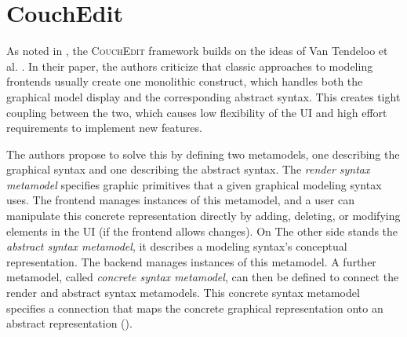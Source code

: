 \section{CouchEdit}
\label{sec:CouchEdit}








As noted in , the \textsc{CouchEdit} framework builds on the ideas of Van Tendeloo et al. \cite{van_tendeloo_concrete_2017}. In their paper, the authors criticize that classic approaches to modeling frontends usually create one monolithic construct, which handles both the graphical model display and the corresponding abstract syntax. This creates tight coupling between the two, which causes low flexibility of the UI and high effort requirements to implement new features. 

The authors propose to solve this by defining two metamodels, one describing the graphical syntax and one describing the abstract syntax. The \emph{render syntax metamodel} specifies graphic primitives that a given graphical modeling syntax uses. The frontend manages instances of this metamodel, and a user can manipulate this concrete representation directly by adding, deleting, or modifying elements in the UI (if the frontend allows changes). On The other side stands the \emph{abstract syntax metamodel}, it describes a modeling syntax's conceptual representation. The backend manages instances of this metamodel. A further metamodel, called \emph{concrete syntax metamodel}, can then be defined to connect the render and abstract syntax metamodels. This concrete syntax metamodel specifies a connection that maps the concrete graphical representation onto an abstract representation ().


